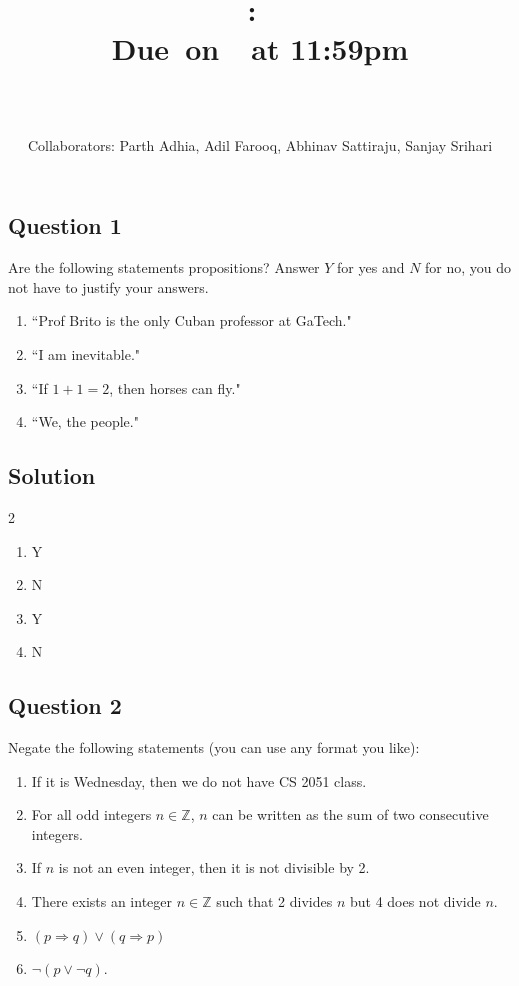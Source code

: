 \documentclass{article}
\title{
    \vspace{2in}
    \textbf{\hmwkClass:\ \hmwkTitle}\\
    \normalsize\vspace{0.1in}\small{Due\ on\ \hmwkDueDate\ at 11:59pm}\\
    \vspace{0.1in}\large{\textit{\hmwkClassInstructor}}
    \vspace{3in}
    \author{\textbf{\hmwkAuthorName} \\ \\
    Collaborators: Parth Adhia, Adil Farooq, Abhinav Sattiraju, Sanjay Srihari}
    \date{}
}
\begin{document}
\maketitle
\pagebreak

\subsection*{Question 1}
    Are the following statements propositions? Answer $Y$ for yes and $N$ for no, you do not have to justify your answers.
    \begin{enumerate}
        \item ``Prof Brito is the only Cuban professor at GaTech."
        \item ``I am inevitable."
        \item ``If $1 + 1 = 2$, then horses can fly."
        \item ``We, the people."
    \end{enumerate}

\subsection*{Solution}
    \begin{multicols}{2}
    \begin{enumerate}
        \item Y
        \item N
        \item Y
        \item N
    \end{enumerate}
    \end{multicols}

\subsection*{Question 2}
    Negate the following statements (you can use any format you like): 
    \begin{enumerate}
        \item If it is Wednesday, then we do not have CS 2051 class.
        \item For all odd integers $n \in \mathbb{Z}$, $n$ can be written as the sum of two consecutive integers.
        \item If $n$ is not an even integer, then it is not divisible by 2.
        \item There exists an integer $n \in \mathbb{Z}$ such that 2 divides $n$ but 4 does not divide $n$.
        \item $(p \Rightarrow q) \lor (q \Rightarrow p)$
        \item $\neg(p \lor \neg q)$.
    \end{enumerate}
\end{document}
